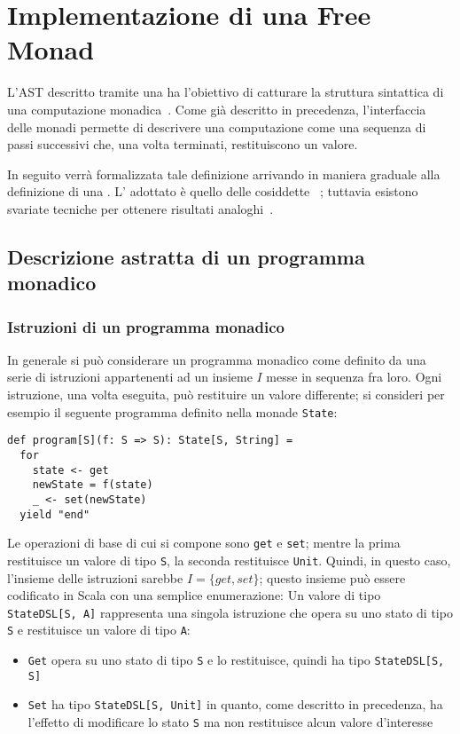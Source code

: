 \section{Implementazione di una Free Monad}

L'\ac{AST} descritto tramite una  ha l'obiettivo di catturare la struttura sintattica di una computazione monadica~\cite{cit:programming-monads-operationally-with-unimo}.
Come già descritto in precedenza, l'interfaccia delle monadi permette di descrivere una computazione come una sequenza di passi successivi che, una volta terminati, restituiscono un valore.

In seguito verrà formalizzata tale definizione arrivando in maniera graduale alla definizione di una .
L' adottato è quello delle cosiddette ~\cite{cit:programming-monads-operationally-with-unimo}; tuttavia esistono svariate tecniche per ottenere risultati analoghi~\cite{cit:data-types-a-la-carte,cit:freer-monads-more-extensible-effects,cit:fusion-for-free}.

\subsection{Descrizione astratta di un programma monadico}
\subsubsection{Istruzioni di un programma monadico}
In generale si può considerare un programma monadico come definito da una serie di istruzioni appartenenti ad un insieme $I$ messe in sequenza fra loro.
Ogni istruzione, una volta eseguita, può restituire un valore differente; si consideri per esempio il seguente programma definito nella monade \lstinline{State}:
\begin{lstlisting}[language=scala3]
def program[S](f: S => S): State[S, String] =
  for
    state <- get
    newState = f(state)
    _ <- set(newState)
  yield "end"
\end{lstlisting}
Le operazioni di base di cui si compone sono \lstinline{get} e \lstinline{set}; mentre la prima restituisce un valore di tipo \lstinline{S}, la seconda restituisce \lstinline{Unit}.
Quindi, in questo caso, l'insieme delle istruzioni sarebbe $I = \{get, set\}$; questo insieme può essere codificato in Scala con una semplice enumerazione:
Un valore di tipo \lstinline{StateDSL[S, A]} rappresenta una singola istruzione che opera su uno stato di tipo \lstinline{S} e restituisce un valore di tipo \lstinline{A}:
\begin{itemize}
  \item \lstinline{Get} opera su uno stato di tipo \lstinline{S} e lo restituisce, quindi ha tipo \lstinline{StateDSL[S, S]}
  \item \lstinline{Set} ha tipo \lstinline{StateDSL[S, Unit]} in quanto, come descritto in precedenza, ha l'effetto di modificare lo stato \lstinline{S} ma non restituisce alcun valore d'interesse
\end{itemize}

